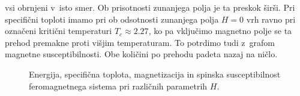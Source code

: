 \documentclass[a4paper,pdftex,10pt]{article}
\numberwithin{figure}{section} %
\begin{document}
vsi obrnjeni v~isto smer. Ob prisotnosti zunanjega polja je ta preskok širši. Pri 
specifični toploti imamo pri ob odsotnosti zunanjega polja $H=0$ vrh ravno pri označeni 
kritični temperaturi $T_c \approx 2.27$, ko pa vključimo magnetno polje se ta prehod 
premakne proti višjim temperaturam. To potrdimo tudi z~grafom magnetne susceptibilnosti.
Obe količini po prehodu padeta nazaj na ničlo.
\begin{figure}[H] 
    \centering 
    \resizebox{0.49\textwidth}{!}{} 
    \resizebox{0.49\textwidth}{!}{} 

    \resizebox{0.49\textwidth}{!}{} 
    \resizebox{0.49\textwidth}{!}{} 
    \caption{Energija, specifična toplota, magnetizacija in spinska susceptibilnost 
    feromagnetnega sistema pri različnih parametrih $H$.}
    \label{slika6}
\end{figure}
\end{document}
